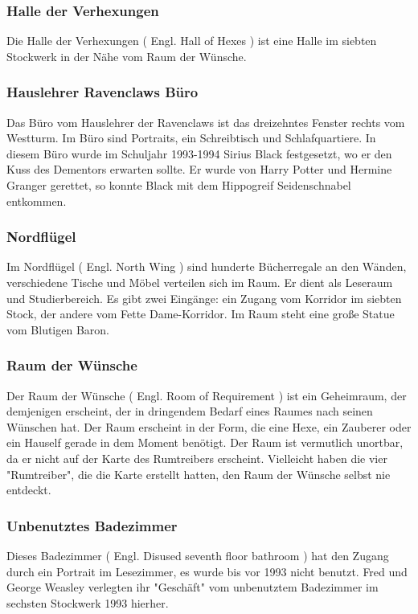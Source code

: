 \documentclass[a4paper, 10pt]{article}
\begin{document}
\subsubsection*{\large Halle der Verhexungen}
Die Halle der Verhexungen (  Engl.  Hall of Hexes ) ist eine Halle im siebten Stockwerk in der Nähe vom Raum der Wünsche.
\subsubsection*{\large Hauslehrer Ravenclaws Büro}
Das Büro vom Hauslehrer der Ravenclaws ist das dreizehntes Fenster rechts vom Westturm. Im Büro sind Portraits, ein Schreibtisch und Schlafquartiere. In diesem Büro wurde im Schuljahr 1993-1994 Sirius Black festgesetzt, wo er den Kuss des Dementors erwarten sollte. Er wurde von Harry Potter und Hermine Granger gerettet, so konnte Black mit dem Hippogreif Seidenschnabel entkommen.
\subsubsection*{\large Nordflügel}
Im Nordflügel (  Engl.  North Wing ) sind hunderte Bücherregale an den Wänden, verschiedene Tische und Möbel verteilen sich im Raum. Er dient als Leseraum und Studierbereich. Es gibt zwei Eingänge: ein Zugang vom Korridor im siebten Stock, der andere vom Fette Dame-Korridor. Im Raum steht eine große Statue vom Blutigen Baron.
\subsubsection*{\large Raum der Wünsche}
Der Raum der Wünsche (  Engl.  Room of Requirement ) ist ein Geheimraum, der demjenigen erscheint, der in dringendem Bedarf eines Raumes nach seinen Wünschen hat. Der Raum erscheint in der Form, die eine Hexe, ein Zauberer oder ein Hauself gerade in dem Moment benötigt. Der Raum ist vermutlich unortbar, da er nicht auf der Karte des Rumtreibers erscheint. Vielleicht haben die vier "Rumtreiber", die die Karte erstellt hatten, den Raum der Wünsche selbst nie entdeckt.
\subsubsection*{\large Unbenutztes Badezimmer}
Dieses Badezimmer (  Engl.  Disused seventh floor bathroom ) hat den Zugang durch ein Portrait im Lesezimmer, es wurde bis vor 1993 nicht benutzt. Fred und George Weasley verlegten ihr "Geschäft" vom unbenutztem Badezimmer im sechsten Stockwerk 1993 hierher.
\end{document}
